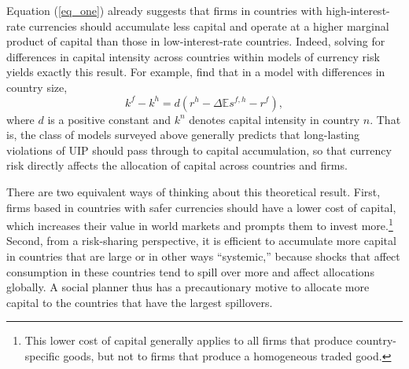 \documentclass{ar-1col}
\begin{document}
Equation (\ref{eq_one}) already suggests that firms in countries with high-interest-rate currencies should accumulate less capital and operate at a higher marginal product of capital than those in low-interest-rate countries. Indeed, solving for differences in capital intensity across countries within models of currency risk yields exactly this result. For example, \citet{HassanMertensZhang2015} find that in a model with differences in country size,  
\begin{equation}
    k^f - k^h = d
    \left(r^h - \Delta \mathbb{E} s^{f, h} - r^f \right),
\end{equation}
where $d$ is a positive constant and $k^n$ denotes capital intensity in country $n$. That is, the class of models surveyed above generally predicts that long-lasting violations of UIP should pass through to capital accumulation, so that currency risk directly affects the allocation of capital across countries and firms.

There are two equivalent ways of thinking about this theoretical result. First, firms based in countries with safer currencies should have a lower cost of capital, which increases their value in world markets and prompts them to
invest more.\footnote{This lower cost of capital generally applies to all firms that produce country-specific goods, but not to firms that produce a homogeneous traded good.} 
Second, from a risk-sharing perspective, it is efficient to accumulate more capital in countries that are large or in other ways ``systemic,'' because shocks that affect consumption in these countries tend to spill over more and affect allocations globally. A social planner thus has a precautionary motive to allocate more capital to the countries that have the largest spillovers.

\end{document}
